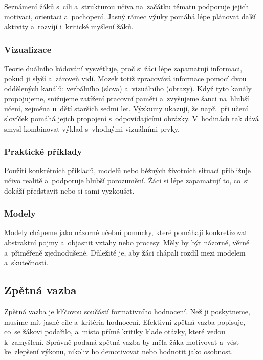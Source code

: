 \documentclass[male,czech,api_bc]{kitheses}
\begin{document}
Seznámení žáků s~cíli a~strukturou učiva na~začátku tématu podporuje jejich motivaci, orientaci a~pochopení. Jasný rámec výuky pomáhá lépe plánovat další aktivity a~rozvíjí i~kritické myšlení žáků.\cite{eduStrukturaUciva}

\subsubsection{Vizualizace}

Teorie duálního kódování vysvětluje, proč si žáci lépe zapamatují informaci, pokud ji slyší a~zároveň vidí.\cite{eduDualCoding} Mozek totiž zpracovává informace pomocí dvou oddělených kanálů: verbálního (slova) a~vizuálního (obrazy). Když tyto kanály propojujeme, snižujeme zatížení pracovní paměti a~zvyšujeme šanci na~hlubší učení, zejména u~dětí starších sedmi let. Výzkumy \cite{eduEFL} ukazují, že např.~při učení slovíček pomáhá jejich propojení s~odpovídajícími obrázky. V~hodinách tak dává smysl kombinovat výklad s~vhodnými vizuálními prvky.\cite{eduVizualizace}

\subsubsection{Praktické příklady}

Použití konkrétních příkladů, modelů nebo běžných životních situací přibližuje učivo realitě a~podporuje hlubší porozumění. Žáci si lépe zapamatují to, co~si dokáží představit nebo si sami vyzkoušet.\cite{eduPraktickePriklady}

\subsubsection{Modely}

Modely chápeme jako názorné učební pomůcky, které pomáhají konkretizovat abstraktní pojmy a~objasnit vztahy nebo procesy. Měly by být názorné, věrné a~přiměřeně zjednodušené. Důležité je, aby žáci chápali rozdíl mezi modelem a~skutečností.\cite{eduModely}

\subsection{Zpětná vazba}

Zpětná vazba je klíčovou součástí formativního hodnocení. Než ji poskytneme, musíme mít jasné cíle a~kritéria hodnocení. Efektivní zpětná vazba popisuje, co~se žákovi podařilo, a~místo přímé kritiky klade otázky, které vedou k~zamyšlení. Správně podaná zpětná vazba by měla žáka motivovat a~vést ke~zlepšení výkonu, nikoliv ho demotivovat nebo hodnotit jako osobnost.\cite{eduZpetnaVazba}
\end{document}
